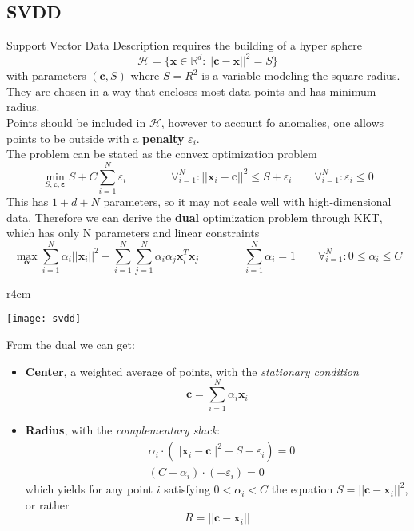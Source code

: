 \subsection{SVDD}
Support Vector Data Description requires the building of a hyper sphere
\begin{equation}
	\mathcal{H} = \{\mathbf{x} \in \mathbb{R}^d: \lvert\lvert \mathbf{c} - \mathbf{x} \rvert\rvert^2 = S\}
\end{equation}
with parameters $(\mathbf{c}, S)$ where $S=R^2$ is a variable modeling the square radius. They are chosen in a way that encloses most data points and has minimum radius.\\
Points should be included in $\mathcal{H}$, however to account fo anomalies, one allows points to be outside with a \textbf{penalty} $\varepsilon_i$.\\
The problem can be stated as the convex optimization problem
\begin{equation}
	\min_{S, \mathbf{c}, \mathbf{\varepsilon}} S + C \sum_{i=1}^N \varepsilon_i \qquad\qquad \forall_{i=1}^N: \lvert\lvert \mathbf{x}_i - \mathbf{c} \rvert\rvert ^ 2 \leq S + \varepsilon_i \qquad \forall_{i=1}^N : \varepsilon_i \leq 0
\end{equation} 
This has $1+d+N$ parameters, so it may not scale well with high-dimensional data. Therefore we can derive the \textbf{dual} optimization problem through KKT, which has only N parameters and linear constraints
\begin{equation}
	\max_{\mathbf{\alpha}}\sum_{i=1}^N \alpha_i \lvert\lvert \mathbf{x}_i \rvert\rvert ^ 2 - \sum_{i=1}^{N} \sum_{j=1}^{N} \alpha_i \alpha_j \mathbf{x}_i^T \mathbf{x}_j \qquad\qquad \sum_{i=1}^N \alpha_i = 1 \qquad \forall_{i=1}^N: 0 \leq \alpha_i \leq C
\end{equation}
\begin{wrapfigure}[10]{r}{4cm}
	\begin{center}
		\texttt{[image: svdd]}
	\end{center}
\end{wrapfigure}
From the dual we can get:
\begin{itemize}
	\item \textbf{Center}, a weighted average of points, with the \textit{stationary condition}
	\begin{equation}
		\mathbf{c} = \sum_{i=1}^{N} \alpha_i \mathbf{x}_i
	\end{equation}
	\item \textbf{Radius}, with the \textit{complementary slack}:
	\begin{align*}
		& \alpha_i \cdot (\lvert\lvert \mathbf{x}_i - \mathbf{c} \rvert\rvert^2 - S - \varepsilon_i) = 0\\
		& (C - \alpha_i) \cdot (-\varepsilon_i) = 0
	\end{align*}
	which yields for any point $i$ satisfying $0 < \alpha_i < C$ the equation $S=\lvert\lvert \mathbf{c} - \mathbf{x}_i \rvert\rvert^2$, or rather
	\begin{equation}
		R = \lvert\lvert \mathbf{c} - \mathbf{x}_i \rvert\rvert
	\end{equation}
\end{itemize}

